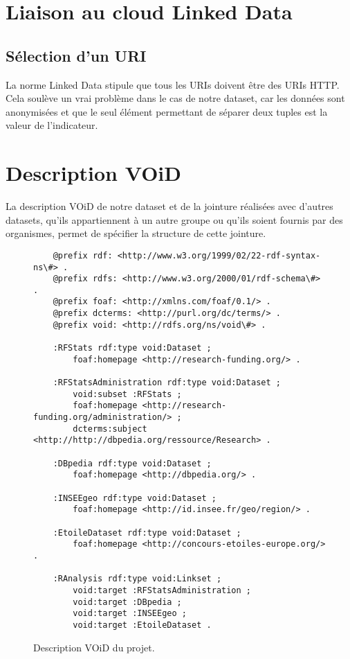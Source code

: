\chapter{Liaison au cloud Linked Data}
\section{Sélection d'un URI}

La norme Linked Data stipule que tous les URIs doivent être des URIs HTTP. Cela soulève un vrai problème dans le cas de notre dataset, car les données sont anonymisées et que le seul élément permettant de séparer deux tuples est la valeur de l'indicateur.

\chapter{Description VOiD}

La description VOiD de notre dataset et de la jointure réalisées avec d'autres datasets, qu'ils appartiennent à un autre groupe ou qu'ils soient fournis par des organismes, permet de spécifier la structure de cette jointure.

\begin{figure}[H]
\begin{lstlisting}
    @prefix rdf: <http://www.w3.org/1999/02/22-rdf-syntax-ns\#> .
    @prefix rdfs: <http://www.w3.org/2000/01/rdf-schema\#> .
    @prefix foaf: <http://xmlns.com/foaf/0.1/> .
    @prefix dcterms: <http://purl.org/dc/terms/> .
    @prefix void: <http://rdfs.org/ns/void\#> .
    
    :RFStats rdf:type void:Dataset ;
        foaf:homepage <http://research-funding.org/> .
    
    :RFStatsAdministration rdf:type void:Dataset ;
        void:subset :RFStats ;
        foaf:homepage <http://research-funding.org/administration/> ;
        dcterms:subject <http://http://dbpedia.org/ressource/Research> .
    
    :DBpedia rdf:type void:Dataset ;
        foaf:homepage <http://dbpedia.org/> .
    
    :INSEEgeo rdf:type void:Dataset ;
        foaf:homepage <http://id.insee.fr/geo/region/> .
    
    :EtoileDataset rdf:type void:Dataset ;
        foaf:homepage <http://concours-etoiles-europe.org/> .
    
    :RAnalysis rdf:type void:Linkset ;
        void:target :RFStatsAdministration ;
        void:target :DBpedia ;
        void:target :INSEEgeo ;
        void:target :EtoileDataset .
\end{lstlisting}
\caption{Description VOiD du projet.}
\end{figure}

